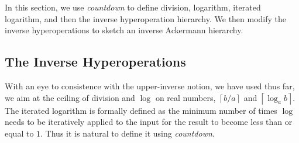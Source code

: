 In this section, we use \emph{countdown} to define division, logarithm,
iterated logarithm, and then the inverse hyperoperation hierarchy.
We then modify the inverse hyperoperations to sketch an inverse 
Ackermann hierarchy.

\subsection{The Inverse Hyperoperations}
With an eye to consistence with the upper-inverse notion, we have used thus far,
we aim at the ceiling of division and $\log$ on real numbers, $\left\lceil b/a \right\rceil$ and $\left\lceil \log_ab \right\rceil$. The iterated logarithm is formally defined as the minimum number of times $\log$ needs to be iteratively 
applied to the input for the result to become less than or equal to $1$. 
Thus it is natural to define it using \emph{countdown}.


